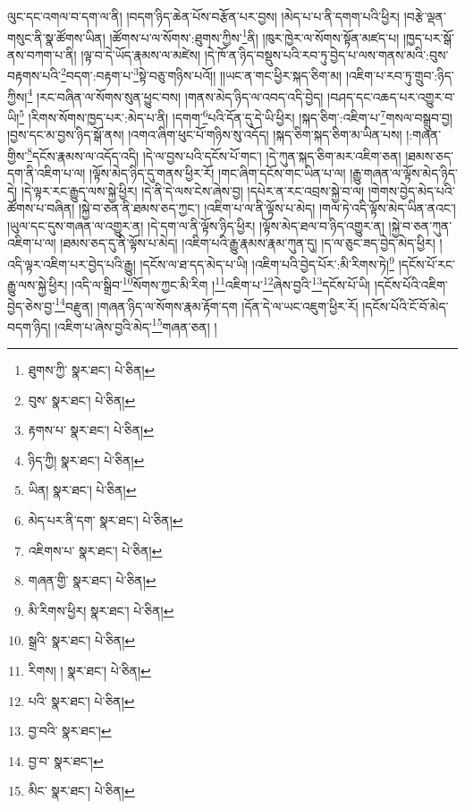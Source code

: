 ལུང་དང་འགལ་བ་དག་ལ་ནི། །བདག་ཉིད་ཆེན་པོས་བརྩོན་པར་བྱས། །མེད་པ་པ་ནི་དགག་པའི་ཕྱིར། །བརྩེ་ལྡན་གསུང་ནི་སྣ་ཚོགས་ཡིན། །ཚོགས་པ་ལ་སོགས་:ཐུགས་ཀྱིས་\footnote{ཐུགས་ཀྱི་  སྣར་ཐང་།  པེ་ཅིན། }ནི། །ཁུར་ཁྱེར་ལ་སོགས་སྟོན་མཛད་པ། །ཁྱད་པར་སྒོ་ནས་བཀག་པ་ནི། །ལྟ་བ་དེ་ཡོད་རྣམས་ལ་མཛེས། །དེ་ཁོ་ན་ཉིད་བསྡུས་པའི་རབ་ཏུ་བྱེད་པ་ལས་གནས་མའི་:བུས་བརྟགས་པའི་\footnote{བུས་  སྣར་ཐང་།  པེ་ཅིན། }བདག་:བརྟག་པ་\footnote{རྟགས་པ་  སྣར་ཐང་།  པེ་ཅིན། }སྟེ་བཅུ་གཉིས་པའོ།། །།ཡང་ན་གང་ཕྱིར་སྐད་ཅིག་མ། །འཇིག་པ་རབ་ཏུ་གྲུབ་:ཉིད་ཀྱིས།\footnote{ཉིད་ཀྱི།  སྣར་ཐང་།  པེ་ཅིན། } །རང་བཞིན་ལ་སོགས་སུན་ཕྱུང་བས། །གནས་མེད་ཉིད་ལ་འབད་འདི་བྱེད། །བཤད་དང་འཆད་པར་འགྱུར་བ་ཡི།\footnote{ཡིན།  སྣར་ཐང་།  པེ་ཅིན། } །རིགས་སོགས་ཁྱད་པར་:མེད་པ་ནི། །དགག་\footnote{མེད་པར་ནི་དག་  སྣར་ཐང་།  པེ་ཅིན། }པའི་དོན་དུ་དེ་ཡི་ཕྱིར། །སྐད་ཅིག་:འཇིག་པ་\footnote{འཇིགས་པ་  སྣར་ཐང་།  པེ་ཅིན། }གསལ་བསྒྲུབ་བྱ། །བྱས་དང་མ་བྱས་ཉིད་སྒོ་ནས། །འགའ་ཞིག་ཕུང་པོ་གཉིས་སུ་འདོད། །སྐད་ཅིག་སྐད་ཅིག་མ་ཡིན་པས། །:གཞན་གྱིས་\footnote{གཞན་གྱི་  སྣར་ཐང་།  པེ་ཅིན། }དངོས་རྣམས་ལ་འདོད་འདི། །དེ་ལ་བྱས་པའི་དངོས་པོ་གང་། །དེ་ཀུན་སྐད་ཅིག་མར་འཇིག་ཅན། །ཐམས་ཅད་དག་ནི་འཇིག་པ་ལ། །ལྟོས་མེད་ཉིད་དུ་གནས་ཕྱིར་རོ། །གང་ཞིག་དངོས་གང་ཡིན་པ་ལ། །རྒྱུ་གཞན་ལ་ལྟོས་མེད་ཉིད་དེ། །དེ་ལྟར་རང་རྒྱུད་ལས་སྐྱེ་ཕྱིར། །དེ་ནི་དེ་ལས་ངེས་ཞེས་བྱ། །དཔེར་ན་རང་འབྲས་སྐྱེ་བ་ལ། །གེགས་བྱེད་མེད་པའི་ཚོགས་པ་བཞིན། །སྐྱེ་བ་ཅན་ནི་ཐམས་ཅད་ཀྱང་། །འཇིག་པ་ལ་ནི་ལྟོས་པ་མེད། །གལ་ཏེ་འདི་ལྟོས་མེད་ཡིན་ནའང་། །ཡུལ་དང་དུས་གཞན་ལ་འགྱུར་ན། །དེ་དག་ལ་ནི་ལྟོས་ཉིད་ཕྱིར། །ལྟོས་མེད་ཐལ་བ་ཉིད་འགྱུར་ན། །སྐྱེ་བ་ཅན་ཀུན་འཇིག་པ་ལ། །ཐམས་ཅད་དུ་ནི་ལྟོས་པ་མེད། །འཇིག་པའི་རྒྱུ་རྣམས་རྣམ་ཀུན་དུ། །ད་ལ་ཅུང་ཟད་བྱེད་མེད་ཕྱིར། །འདི་ལྟར་འཇིག་པར་བྱེད་པའི་རྒྱུ། །དངོས་ལ་ཐ་དད་མེད་པ་ཡི། །འཇིག་པའི་བྱེད་པོར་:མི་རིགས་ཏེ།\footnote{མི་རིགས་ཕྱིར།  སྣར་ཐང་།  པེ་ཅིན། } །དངོས་པོ་རང་རྒྱུ་ལས་སྐྱེ་ཕྱིར། །འདི་ལ་སྒྲིབ་\footnote{སྒྲའི་  སྣར་ཐང་།  པེ་ཅིན། }སོགས་ཀྱང་མི་རིག །\footnote{རིགས། །  སྣར་ཐང་།  པེ་ཅིན། }འཇིག་པ་\footnote{པའི་  སྣར་ཐང་།  པེ་ཅིན། }ཞེས་བྱའི་\footnote{བྱ་བའི་  སྣར་ཐང་། }དངོས་པོ་ཡི། །དངོས་པོའི་འཇིག་བྱེད་ཅེས་བྱ་\footnote{བྱ་བ་  སྣར་ཐང་། }བརྫུན། །གཞན་ཉིད་ལ་སོགས་རྣམ་རྟོག་དག །དོན་དེ་ལ་ཡང་འཇུག་ཕྱིར་རོ། །དངོས་པོའི་ངོ་བོ་མེད་བདག་ཉིད། །འཇིག་པ་ཞེས་བྱའི་མེད་\footnote{མིང་  སྣར་ཐང་།  པེ་ཅིན། }གཞན་ཅན། །
